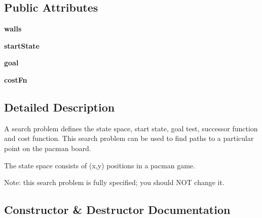 \subsection*{Public Attributes}
\begin{DoxyCompactItemize}
\item 
\mbox{\label{classsearch_agents_1_1_position_search_problem_ade922b17b94e7612d0e083513c77d92a}} 
{\bfseries walls}
\item 
\mbox{\label{classsearch_agents_1_1_position_search_problem_a5144f1ac0fdeb1cf80a1bb2ecd90b34f}} 
{\bfseries start\+State}
\item 
\mbox{\label{classsearch_agents_1_1_position_search_problem_a1d463bd4e4a84e2e9d3a08f8b26c466c}} 
{\bfseries goal}
\item 
\mbox{\label{classsearch_agents_1_1_position_search_problem_a7cd223610ee4fc279273b94856c94bb0}} 
{\bfseries cost\+Fn}
\end{DoxyCompactItemize}


\subsection{Detailed Description}
\begin{DoxyVerb}A search problem defines the state space, start state, goal test,
successor function and cost function.  This search problem can be
used to find paths to a particular point on the pacman board.

The state space consists of (x,y) positions in a pacman game.

Note: this search problem is fully specified; you should NOT change it.
\end{DoxyVerb}
 

\subsection{Constructor \& Destructor Documentation}
\mbox{\label{classsearch_agents_1_1_position_search_problem_a59e8c9a64a7b1f994e127f76587145bf}} 
